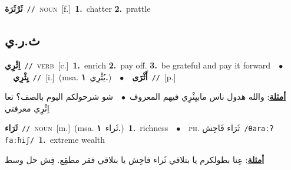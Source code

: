 \documentclass[10pt,a4paper,twoside]{article} %
\begin{document}
\begin{multicols}{2}
{{{\setlength\topsep{0pt}\textbf{\foreignlanguage{arabic}{ثَرْثَرَة}}\ {\color{gray}\texttt{//}\color{black}}\ \textsc{noun}\ [f.]\ \textbf{1.}~chatter  \textbf{2.}~prattle\ 

\vspace{-3mm}
\subsection*{\color{blue}\foreignlanguage{arabic}{ث.ر.ي}\color{blue}{}} 

{\setlength\topsep{0pt}\textbf{\foreignlanguage{arabic}{اِثْرِي}}\ {\color{gray}\texttt{//}\color{black}}\ \textsc{verb}\ [c.]\ \textbf{1.}~enrich  \textbf{2.}~pay off.  \textbf{3.}~be grateful and pay it forward\ \ $\bullet$\ \ \setlength\topsep{0pt}\textbf{\foreignlanguage{arabic}{يِثْرِي}}\ {\color{gray}\texttt{//}\color{black}}\ [i.]\ \color{gray}(msa. \foreignlanguage{arabic}{يُثْرِي}~\foreignlanguage{arabic}{\textbf{١.}})\color{black}\ \ $\bullet$\ \ \setlength\topsep{0pt}\textbf{\foreignlanguage{arabic}{أَثْرَى}}\ {\color{gray}\texttt{//}\color{black}}\ [p.]\  \begin{flushright}\color{gray}\foreignlanguage{arabic}{\textbf{\underline{\foreignlanguage{arabic}{أمثلة}}}: والله هدول ناس مابيِثْرِي فيهم المعروف\ $\bullet$\ \  شو شرحولكم اليوم بالصف؟ تعا اِثْرِي معرفتي}\end{flushright}\color{black}} \vspace{2mm}

{\setlength\topsep{0pt}\textbf{\foreignlanguage{arabic}{ثَرَاء}}\ {\color{gray}\texttt{//}\color{black}}\ \textsc{noun}\ [m.]\ \color{gray}(msa. \foreignlanguage{arabic}{ثَراء}~\foreignlanguage{arabic}{\textbf{١.}})\color{black}\ \textbf{1.}~richness\ \ $\bullet$\ \ \textsc{ph.} \color{gray} \foreignlanguage{arabic}{ثَرَاء فَاحِش}\color{black}\ {\color{gray}\texttt{/{\sffamily θaraːʔ faːħiʃ}/}\color{black}}\ \textbf{1.}~extreme wealth\  \begin{flushright}\color{gray}\foreignlanguage{arabic}{\textbf{\underline{\foreignlanguage{arabic}{أمثلة}}}: عِنا بطولكرم يا بتلاقي ثَراء فاحِش يا بتلاقي فقر مطقِع. فِش حل وسط}\end{flushright}\color{black}} \vspace{2mm}

}}}
\end{multicols}
\end{document}
